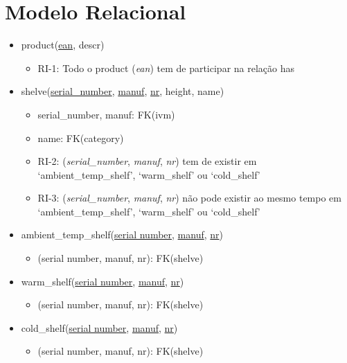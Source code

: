 \documentclass{article}
\newcommand{\bpoint}{\item[$\bullet$]}
\newenvironment{myitemize}
{ \begin{itemize}
	\setlength{\itemsep}{5pt}
	\setlength{\parskip}{0pt}
	\setlength{\parsep}{0pt} }
{ \end{itemize}	}
\begin{document}
	\section*{Modelo Relacional}
	\vspace{2mm}
	\begin{myitemize}

		\item[] product(\underline{ean}, descr)
		\begin{myitemize}
				\bpoint RI-1: Todo o product (\textit{ean}) tem de participar na relação has
		\end{myitemize}

		\vspace{2mm}

		\item[] shelve(\underline{serial\_number}, \underline{manuf}, \underline{nr}, height, name)
		\begin{myitemize}
			\bpoint serial\_number, manuf: FK(ivm)
			\bpoint name: FK(category)
			\bpoint RI-2: (\textit{serial\_number}, \textit{manuf}, \textit{nr}) tem de existir em `ambient\_temp\_shelf', `warm\_shelf' ou `cold\_shelf'
			\bpoint RI-3: (\textit{serial\_number}, \textit{manuf}, \textit{nr}) não pode existir ao mesmo tempo em `ambient\_temp\_shelf', `warm\_shelf' ou `cold\_shelf'
		\end{myitemize}

		\vspace{2mm}

		\item[] ambient\_temp\_shelf(\underline{serial number}, \underline{manuf}, \underline{nr})
		\begin{myitemize}
			\bpoint (serial number, manuf, nr): FK(shelve)
		\end{myitemize}

		\vspace{2mm}

		\item[] warm\_shelf(\underline{serial number}, \underline{manuf}, \underline{nr})
		\begin{myitemize}
			\bpoint (serial number, manuf, nr): FK(shelve)
		\end{myitemize}

		\vspace{2mm}

		\item[]{cold\_shelf(\underline{serial number}, \underline{manuf}, \underline{nr})}
		\begin{myitemize}
			\bpoint (serial number, manuf, nr): FK(shelve)
		\end{myitemize}


\end{myitemize}
\end{document}
